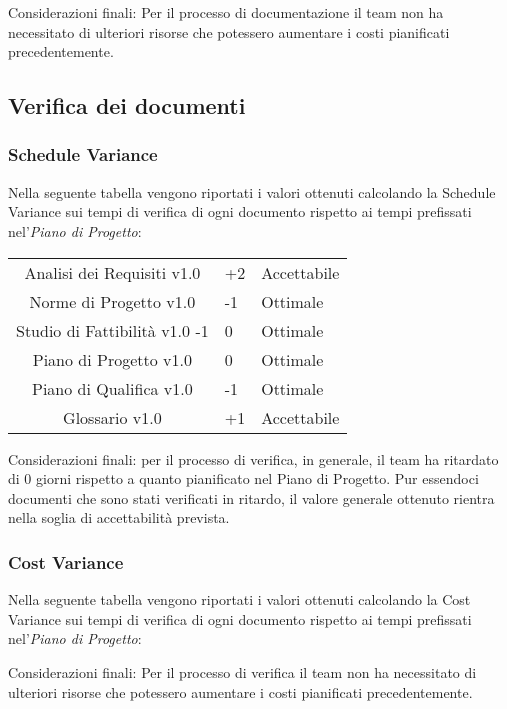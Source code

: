 
Considerazioni finali: Per il processo di documentazione il team non ha necessitato di ulteriori risorse che potessero aumentare i costi pianificati precedentemente.

\subsection{Verifica dei documenti}
\subsubsection{Schedule Variance}
Nella seguente tabella vengono riportati i valori ottenuti calcolando la Schedule Variance sui tempi di verifica di ogni documento rispetto ai tempi prefissati nel'\textit{Piano di Progetto}:

{
	\centering
	\begin{tabular}{| c | R{0.5cm} | C{3cm} |}
		Analisi dei Requisiti v1.0 & +2 & Accettabile \\
		Norme di Progetto v1.0 & -1 & Ottimale \\
		Studio di Fattibilità v1.0 -1 &  0 &  Ottimale \\
		Piano di Progetto v1.0 &  0 &  Ottimale\\
		Piano di Qualifica v1.0 & -1 & Ottimale \\
		Glossario v1.0 & +1 & Accettabile\\	
	\end{tabular}
}


Considerazioni finali: per il processo di verifica, in generale, il team ha ritardato di 0 giorni rispetto a quanto pianificato nel Piano di Progetto. Pur essendoci documenti che sono stati verificati in ritardo, il valore generale ottenuto rientra nella soglia di accettabilità prevista.

\subsubsection{Cost Variance}
Nella seguente tabella vengono riportati i valori ottenuti calcolando la Cost Variance sui tempi di verifica di ogni documento rispetto ai tempi prefissati nel'\textit{Piano di Progetto}:


Considerazioni finali: Per il processo di verifica il team non ha necessitato di ulteriori risorse che potessero aumentare i costi pianificati precedentemente.


